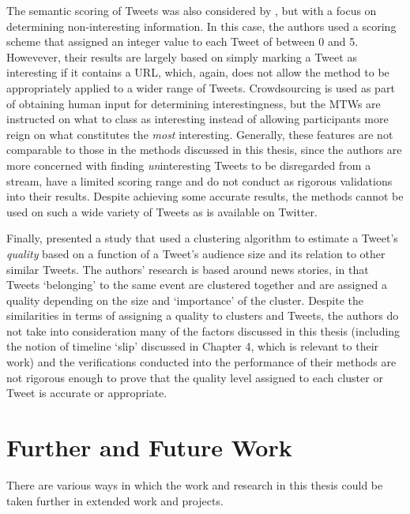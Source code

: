 The semantic scoring of Tweets was also considered by \citet{alonso10}, but with a focus on determining non-interesting information. In this case, the authors used a scoring scheme that assigned an integer value to each Tweet of between 0 and 5. Howevever, their results are largely based on simply marking a Tweet as interesting if it contains a URL, which, again, does not allow the method to be appropriately applied to a wider range of Tweets. Crowdsourcing is used as part of obtaining human input for determining interestingness, but the MTWs are instructed on what to class as interesting instead of allowing participants more reign on what constitutes the \textit{most} interesting. Generally, these features are not comparable to those in the methods discussed in this thesis, since the authors are more concerned with finding \textit{un}interesting Tweets to be disregarded from a stream, have a limited scoring range and do not conduct as rigorous validations into their results. Despite achieving some accurate results, the methods cannot be used on such a wide variety of Tweets as is available on Twitter.

Finally, \citet{lauw10} presented a study that used a clustering algorithm to estimate a Tweet's \textit{quality} based on a function of a Tweet's audience size and its relation to other similar Tweets. The authors' research is based around news stories, in that Tweets `belonging' to the same event are clustered together and are assigned a quality depending on the size and `importance' of the cluster. Despite the similarities in terms of assigning a quality to clusters and Tweets, the authors do not take into consideration many of the factors discussed in this thesis (including the notion of timeline `slip' discussed in Chapter 4, which is relevant to their work) and the verifications conducted into the performance of their methods are not rigorous enough to prove that the quality level assigned to each cluster or Tweet is accurate or appropriate.


\section{Further and Future Work}
There are various ways in which the work and research in this thesis could be taken further in extended work and projects.



